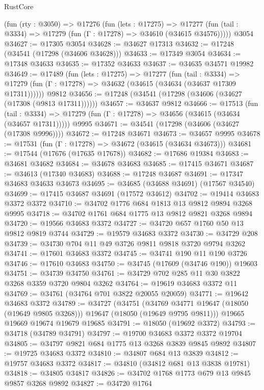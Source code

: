 \begin{lexlean}{RustCore}
\begin{coremodule}
    (fun (rty : @3050) =>
    @17276
      (fun (lets : @17275) =>
      @17277 (fun (tail : @3334) => @17279 (fun (Γ : @17278) => @34610 (@34615 @34576)))))
    @3054
@34627 := @17305 @3054
@34628 := @34627 @17313
@34632 := @17248 (@34541 (@17298 (@34606 @34628)))
@34633 := @17349 @3054
@34634 := @17348 @34633
@34635 := @17352 @34633
@34637 := @34635 @34571 @19982
@34649 := @17489
    (fun (lets : @17275) =>
    @17277
      (fun (tail : @3334) =>
      @17279 (fun (Γ : @17278) => @34632 (@34615 (@34634 (@34637 @17309 @17311))))))
    @9812
@34656 := @17248 (@34541 (@17298 (@34606 (@34627 (@17308 (@9813 @17311))))))
@34657 := @34637 @9812
@34666 := @17513
    (fun (tail : @3334) => @17279 (fun (Γ : @17278) => @34656 (@34615 (@34634 (@34657 @17311)))))
    @9995
@34671 := @34541 (@17298 (@34606 (@34627 (@17308 @9996))))
@34672 := @17248 @34671
@34673 := @34657 @9995
@34678 := @17531 (fun (Γ : @17278) => @34672 (@34615 (@34634 @34673)))
@34681 := @17544 (@17676 (@17635 @17678))
@34682 := @17686 @19384
@34683 := @34681 @34682
@34684 := @34678 @34683
@34685 := @17415 @34671
@34687 := @34613 (@17340 @34683)
@34688 := @17248 @34687
@34691 := @17347 @34683 @34633 @34673
@34695 := @34685 (@34688 @34691) (@17567 @34540)
@34699 := @17415 @34687 @34691 (@17572 @34612)
@34702 := @19414 @34683 @3372 @3372
@34710 := @34702 @1776 @684 @1813 @13 @9812 @9894 @3268 @9995
@34718 := @34702 @1761 @684 @1775 @13 @9812 @9821 @3268 @9894
@34720 := @19566 @34683 @3372
@34727 := @34720 @657 @1760 @50 @13 @9812 @9819 @3744
@34729 := @19579 @34683 @3372
@34730 := @34729 @208
@34739 := @34730 @704 @11 @49 @3726 @9811 @9818 @3720 @9794 @3262
@34741 := @17601 @34683 @3372
@34745 := @34741 @190 @11 @190 @3726
@34746 := @17610 @34683
@34750 := @34745 (@17609 (@34746 @190)) @19603
@34751 := @34739 @34750
@34761 := @34729 @702 @285 @11 @30 @3822 @3268 @3359 @3720 @9804 @3262
@34764 := @19619 @34683 @3372 @11
@34769 := @34761 (@34764 @701 @3822 @20055 @20059)
@34771 := @19642 @34683 @3372
@34789 := @34727
    (@34751
      (@34769 @34771 @19647 (@18050 (@19649 @9805 @3268)))
      @19647
      (@18050 (@19649 @9795 @9811)))
    @19665
    @19669
    @19674
    @19679
    @19685
@34791 := @18050 (@19692 @3372)
@34793 := @34718 (@34789 @34791)
@34797 := @19700 @34683 @3372 @3372 @19704
@34805 := @34797 @9821 @684 @1775 @13 @3268 @3839 @9845 @9892
@34807 := @19725 @34683 @3372
@34810 := @34807 @684 @13 @3839
@34812 := @19757 @34683 @3372
@34817 := @34810 (@34812 @681 @13 @3838 @19781)
@34818 := @34805 @34817
@34826 := @34702 @1768 @1773 @679 @13 @9845 @9857 @3268 @9892
@34827 := @34720 @1764

\end{coremodule}
\end{lexlean}

